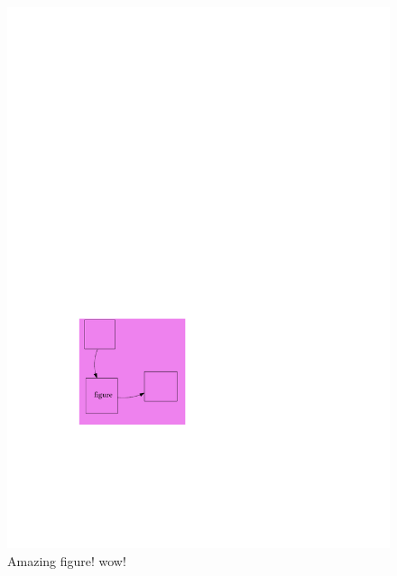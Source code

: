 \documentclass[a4paper,12pt]{memoir}
\begin{document}
\begin{figure}
\begin{minipage}{0.5\textwidth}
    \noindent\includegraphics[scale=1,page=2]{myfigure.pdf}\par
    \rule{0pt}{1pt}\par
  \end{minipage}%
  \par
  \caption{Amazing figure! wow!}
\end{figure}
\end{document}
